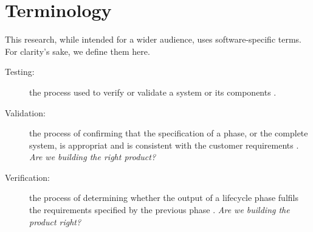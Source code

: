 \chapter{Terminology}
This research, while intended for a wider audience, uses software-specific
terms. For clarity's sake, we define them here.

\begin{description}

\item[Testing:] the process used to verify or validate a system or its 
components \cite{Storey95}.

\item[Validation:] the process of confirming that the specification of a phase,
or the complete system, is appropriat and is consistent with the customer
requirements \cite{Storey95}. \textit{Are we building the right product?}

\item[Verification:] the process of determining whether the output of a
lifecycle phase fulfils the requirements specified by the previous phase
\cite{Storey95}. \textit{Are we building the product right?}


\end{description}

